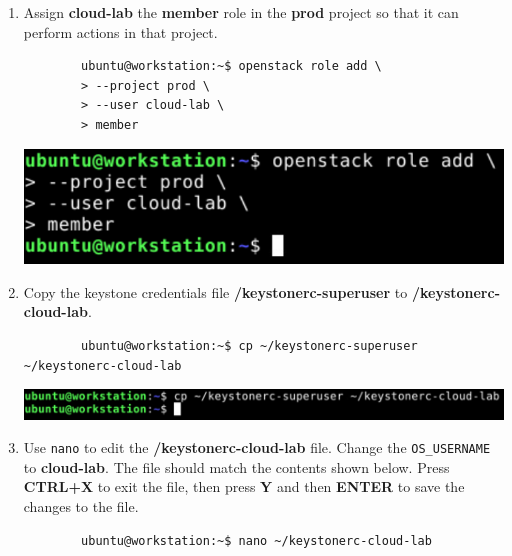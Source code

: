 \documentclass[letterpaper, 12pt]{article}
\begin{document}
\begin{enumerate}
    \item Assign \textbf{cloud-lab} the \textbf{member} role in the \textbf{prod} project so that it can perform actions
    in that project.
    \begin{lstlisting}
        ubuntu@workstation:~$ openstack role add \
        > --project prod \
        > --user cloud-lab \
        > member
    \end{lstlisting}

    \begin{center}
        \includegraphics[width=\linewidth]{images/part1/step11.png}
    \end{center}

    \item Copy the keystone credentials file \textbf{\texttildemid/keystonerc-superuser} to
    \textbf{\texttildemid/keystonerc-cloud-lab}.
    \begin{lstlisting}
        ubuntu@workstation:~$ cp ~/keystonerc-superuser ~/keystonerc-cloud-lab
    \end{lstlisting}

    \begin{center}
        \includegraphics[width=\linewidth]{images/part1/step12.png}
    \end{center}

    \item Use \texttt{nano} to edit the \textbf{\texttildemid/keystonerc-cloud-lab} file. Change the
    \texttt{OS\_USERNAME} to \textbf{cloud-lab}. The file should match the contents shown below. Press \textbf{CTRL+X}
    to exit the file, then press \textbf{Y} and then \textbf{ENTER} to save the changes to the file.
    \begin{lstlisting}
        ubuntu@workstation:~$ nano ~/keystonerc-cloud-lab
    \end{lstlisting}


\end{enumerate}
\end{document}
